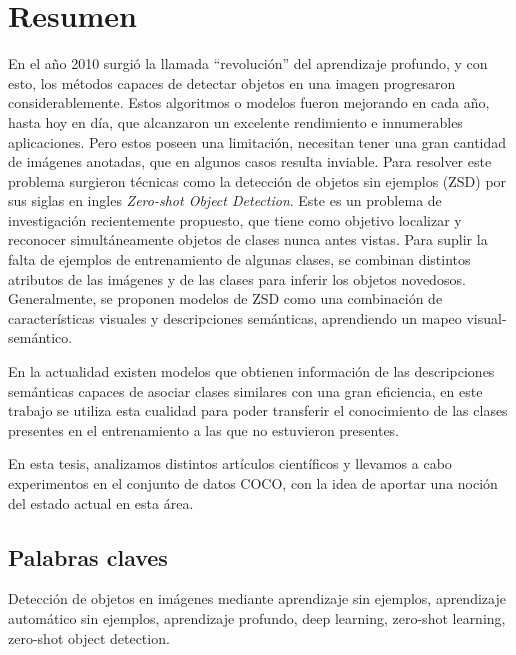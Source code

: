 \documentclass[12pt,twosided]{book}
\begin{document}
\chapter*{Resumen}

\pagestyle{plain}

En el año 2010 surgió la llamada ``revolución'' del aprendizaje profundo, y con esto, los métodos capaces de detectar objetos en una imagen progresaron considerablemente. Estos algoritmos o modelos fueron mejorando en cada año, hasta hoy en día, que alcanzaron un excelente rendimiento e innumerables aplicaciones. Pero estos poseen una limitación, necesitan tener una gran cantidad de imágenes anotadas, que en algunos casos resulta inviable. Para resolver este problema surgieron técnicas como la detección de objetos sin ejemplos (ZSD) por sus siglas en ingles \textit{Zero-shot Object Detection}. Este es un problema de investigación recientemente propuesto, que tiene como objetivo localizar y reconocer simultáneamente objetos de clases nunca antes vistas. Para suplir la falta de ejemplos de entrenamiento de algunas clases, se combinan distintos atributos de las imágenes y de las clases para inferir los objetos novedosos. Generalmente, se proponen modelos de ZSD como una combinación de características visuales y descripciones semánticas, aprendiendo un mapeo visual-semántico. 

En la actualidad existen modelos que obtienen información de las descripciones semánticas capaces de asociar clases similares con una gran eficiencia, en este trabajo se utiliza esta cualidad para poder transferir el conocimiento de las clases presentes en el entrenamiento a las que no estuvieron presentes.


En esta tesis, analizamos distintos artículos científicos y llevamos a cabo experimentos en el conjunto de datos COCO, con la idea de aportar una noción del estado actual en esta área.

\section*{Palabras claves}
Detección de objetos en imágenes mediante aprendizaje sin ejemplos, aprendizaje automático sin ejemplos, aprendizaje profundo, deep learning, zero-shot learning, zero-shot object detection.\\
\end{document}
